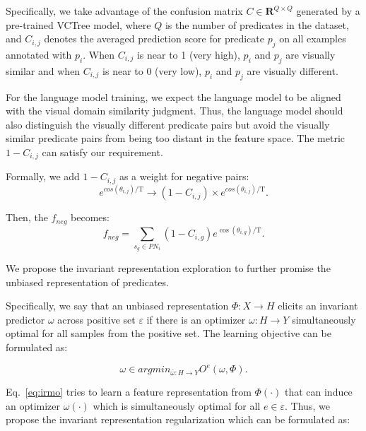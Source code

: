 \documentclass[letterpaper]{article} %
\begin{document}
Specifically, we take advantage of the confusion matrix $C \in \mathbf{R}^{Q\times Q}$ generated by a pre-trained VCTree model, where $ Q $ is the number of predicates in the dataset, and $C_{i,j}$ denotes the averaged prediction score for predicate $p_j$ on all examples annotated with $p_i$.
When $C_{i,j}$ is near to 1 (very high), $p_i$ and $p_j$ are visually similar and when $C_{i,j}$ is near to 0 (very low), $p_i$ and $p_j$ are visually different.

For the language model training, we expect the language model to be aligned with the visual domain similarity judgment.
Thus, the language model should also distinguish the visually different predicate pairs but avoid the visually similar predicate pairs from being too distant in the feature space.
The metric $1-C_{i,j}$ can satisfy our requirement.

Formally, we add $1-C_{i,j}$ as a weight for negative pairs:
\begin{equation}
    e^{cos\left ( \theta _{i,j}    \right )/\mathrm{T} } \to \left ( 1-C_{i,j}  \right ) \times e^{cos\left ( \theta _{i,j}    \right )/\mathrm{T} }. 
\end{equation}

Then, the $f_{neg}$ becomes:
\begin{equation}
    f_{neg} = \sum_{s_{g} \in PN_{i}} \left (1-C_{i,g}   \right )e^{\cos\left(\theta_{i,g}\right) / \mathrm{T}}.
\end{equation}

 We propose the invariant representation exploration to further promise the unbiased representation of predicates.

Specifically, we say that an unbiased representation $ \Phi :X\to H $ elicits an invariant predictor $ \omega  $ across positive set $ \varepsilon  $ if there is an optimizer $ \omega :H\to Y $ simultaneously optimal for all samples from the positive set. The learning objective can be formulated as:

\begin{equation}
\label{eq:irmo}
    \omega \in argmin_{\bar{\omega}:H\to Y}O^{e}(\omega,\Phi).
\end{equation}

Eq.~\ref{eq:irmo} tries to learn a feature representation from $ \Phi (\cdot) $ that can induce an optimizer $ \omega(\cdot) $ which is simultaneously optimal for all $ e \in \varepsilon $.
Thus, we propose the invariant representation regularization which can be formulated as:
\end{document}
